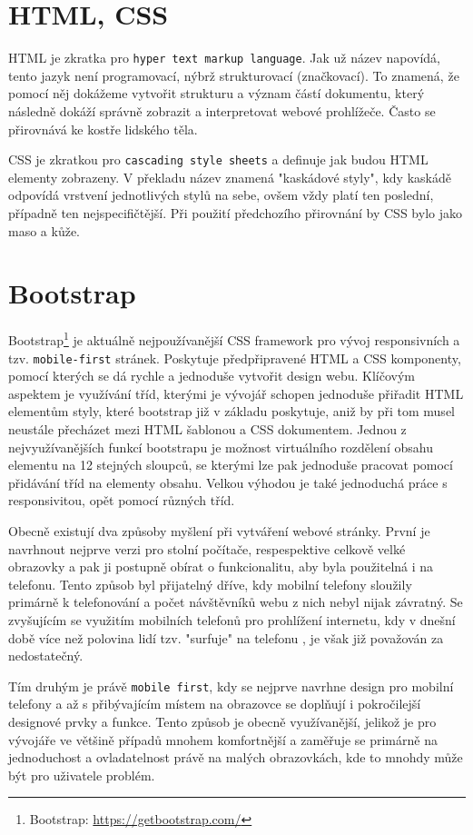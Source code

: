 \section{HTML, CSS}
HTML je zkratka pro \texttt{hyper text markup language}. Jak už název napovídá, tento jazyk není programovací, nýbrž strukturovací (značkovací). To znamená, že pomocí něj dokážeme vytvořit strukturu a význam částí dokumentu, který následně dokáží správně zobrazit a interpretovat webové prohlížeče. Často se přirovnává ke kostře lidského těla.  \cite{HTML}

\par CSS je zkratkou pro \texttt{cascading style sheets} a definuje jak budou HTML elementy zobrazeny. V překladu název znamená "kaskádové styly", kdy kaskádě odpovídá vrstvení jednotlivých stylů na sebe, ovšem vždy platí ten poslední, případně ten nejspecifičtější. Při použití předchozího přirovnání by CSS bylo jako maso a kůže. \cite{CSS} 


\section{Bootstrap}
Bootstrap\footnote{Bootstrap: \url{https://getbootstrap.com/}} je aktuálně nejpoužívanější CSS framework pro vývoj responsivních a tzv. \texttt{mobile-first} stránek. \cite{BOOTSTRAP} Poskytuje předpřipravené HTML a CSS komponenty, pomocí kterých se dá rychle a jednoduše vytvořit design webu. Klíčovým aspektem je využívání tříd, kterými je vývojář schopen jednoduše přiřadit HTML elementům styly, které bootstrap již v základu poskytuje, aniž by při tom musel neustále přecházet mezi HTML šablonou a CSS dokumentem. Jednou z nejvyužívanějších funkcí bootstrapu je možnost virtuálního rozdělení obsahu elementu na 12 stejných sloupců, se kterými lze pak jednoduše pracovat pomocí přidávání tříd na elementy obsahu. Velkou výhodou je také jednoduchá práce s responsivitou, opět pomocí různých tříd.
\par  Obecně existují dva způsoby myšlení při vytváření webové stránky. První je navrhnout nejprve verzi pro stolní počítače, respespektive celkově velké obrazovky a pak ji postupně obírat o funkcionalitu, aby byla použitelná i na telefonu. Tento způsob byl přijatelný dříve, kdy mobilní telefony sloužily primárně k telefonování a počet návštěvníků webu z nich nebyl nijak závratný. Se zvyšujícím se využitím mobilních telefonů pro prohlížení internetu, kdy v dnešní době více než polovina lidí tzv. "surfuje" na telefonu \cite{WEB-DEVICE-USAGE}, je však již považován za nedostatečný.
\par Tím druhým je právě \texttt{mobile first}, kdy se nejprve navrhne design pro mobilní telefony a až s přibývajícím místem na obrazovce se doplňují i pokročilejší designové prvky a funkce. Tento způsob je obecně využívanější, jelikož je pro vývojáře ve většině případů mnohem komfortnější a zaměřuje se primárně na jednoduchost a ovladatelnost právě na malých obrazovkách, kde to mnohdy může být pro uživatele problém.

